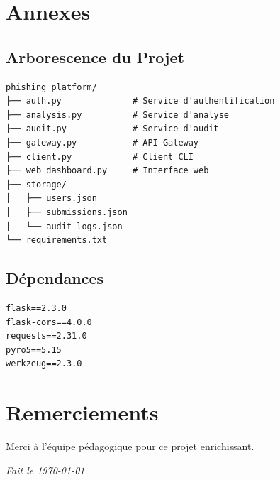 \documentclass[12pt,a4paper]{article}
\begin{document}
\section{Annexes}

\subsection{Arborescence du Projet}

\begin{verbatim}
phishing_platform/
├── auth.py              # Service d'authentification
├── analysis.py          # Service d'analyse
├── audit.py             # Service d'audit
├── gateway.py           # API Gateway
├── client.py            # Client CLI
├── web_dashboard.py     # Interface web
├── storage/
│   ├── users.json
│   ├── submissions.json
│   └── audit_logs.json
└── requirements.txt
\end{verbatim}

\subsection{Dépendances}

\begin{lstlisting}[caption=requirements.txt]
flask==2.3.0
flask-cors==4.0.0
requests==2.31.0
pyro5==5.15
werkzeug==2.3.0
\end{lstlisting}

\section*{Remerciements}
Merci à l'équipe pédagogique pour ce projet enrichissant.

\vspace{1cm}

\begin{flushright}
\textit{Fait le \today}
\end{flushright}
\end{document}
